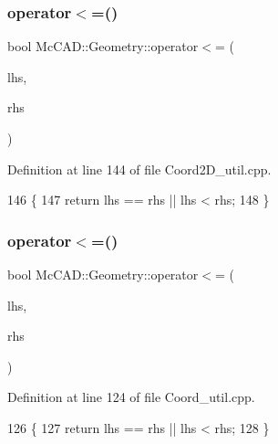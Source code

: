 \subsubsection{\texorpdfstring{operator$<$=()}{operator<=()}\hspace{0.1cm}{\footnotesize\ttfamily [1/3]}}
{\footnotesize\ttfamily bool Mc\+C\+A\+D\+::\+Geometry\+::operator$<$= (\begin{DoxyParamCaption}\item[{const \hyperlink{classMcCAD_1_1Geometry_1_1Coord2D}{Coord2D} \&}]{lhs,  }\item[{const \hyperlink{classMcCAD_1_1Geometry_1_1Coord2D}{Coord2D} \&}]{rhs }\end{DoxyParamCaption})}



Definition at line 144 of file Coord2\+D\+\_\+util.\+cpp.


\begin{DoxyCode}
146                            \{
147     \textcolor{keywordflow}{return} lhs == rhs || lhs < rhs;
148 \}
\end{DoxyCode}
\mbox{\label{namespaceMcCAD_1_1Geometry_af6943ff2d52b3c0746ddaf398120e0c5}} 
\subsubsection{\texorpdfstring{operator$<$=()}{operator<=()}\hspace{0.1cm}{\footnotesize\ttfamily [2/3]}}
{\footnotesize\ttfamily bool Mc\+C\+A\+D\+::\+Geometry\+::operator$<$= (\begin{DoxyParamCaption}\item[{const \hyperlink{classMcCAD_1_1Geometry_1_1Coord}{Coord} \&}]{lhs,  }\item[{const \hyperlink{classMcCAD_1_1Geometry_1_1Coord}{Coord} \&}]{rhs }\end{DoxyParamCaption})}



Definition at line 124 of file Coord\+\_\+util.\+cpp.


\begin{DoxyCode}
126                          \{
127     \textcolor{keywordflow}{return} lhs == rhs || lhs < rhs;
128 \}
\end{DoxyCode}
\mbox{\label{namespaceMcCAD_1_1Geometry_a2e573b3440f9f966af986a850ca62568}} 
